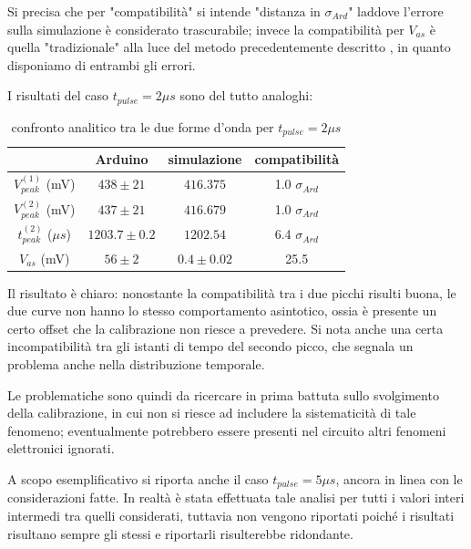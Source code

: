 \documentclass{article}
\begin{document}
Si  precisa che per "compatibilità" si intende "distanza in $\sigma_{Ard}$" laddove l'errore sulla simulazione è considerato trascurabile; invece 
la compatibilità per $V_{as}$ è quella "tradizionale" alla luce del metodo
precedentemente descritto , in quanto disponiamo di entrambi gli errori.

I risultati del caso $t_{pulse}=2 \mu s$ sono del tutto analoghi:

\begin{table}[H]
    \centering
    \begin{tabular}{cccc}
        \toprule
                        & Arduino & simulazione & compatibilità \\
        \midrule
        $V_{peak}^{(1)}$ (mV)&   $438 \pm 21$ & $416.375$ & 1.0 $\sigma_{Ard}$\\
        $V_{peak}^{(2)}$ (mV)&   $437 \pm 21$ & $416.679$ & 1.0 $\sigma_{Ard}$\\
        $t_{peak}^{(2)}$ ($\mu s$)&   $1203.7 \pm 0.2$ & $1202.54$ & 6.4 $\sigma_{Ard}$\\
        $V_{as}$       (mV)&   $56 \pm 2$ & $0.4 \pm 0.02$ & 25.5 \\
        \bottomrule
    \end{tabular}
    \caption{confronto analitico tra le due forme d'onda per $t_{pulse}=2 \mu s$}
\end{table}

Il risultato è chiaro: nonostante la compatibilità tra i due picchi risulti buona, le due curve non hanno lo stesso comportamento asintotico, ossia è presente
un certo offset che la calibrazione non riesce a prevedere. Si nota anche una certa incompatibilità tra gli istanti di tempo del secondo picco, che segnala 
un problema anche nella distribuzione temporale.

Le problematiche sono quindi da ricercare in prima battuta sullo svolgimento della calibrazione, in cui non si riesce ad includere la sistematicità di tale fenomeno;
eventualmente potrebbero essere presenti nel circuito altri fenomeni elettronici ignorati.

A scopo esemplificativo si riporta anche il caso $t_{pulse}=5 \mu s$, ancora in linea con le considerazioni fatte. In realtà è stata effettuata tale analisi per tutti 
i valori interi intermedi tra quelli considerati, tuttavia non vengono riportati poiché i risultati risultano sempre gli stessi e riportarli risulterebbe ridondante.
\end{document}
